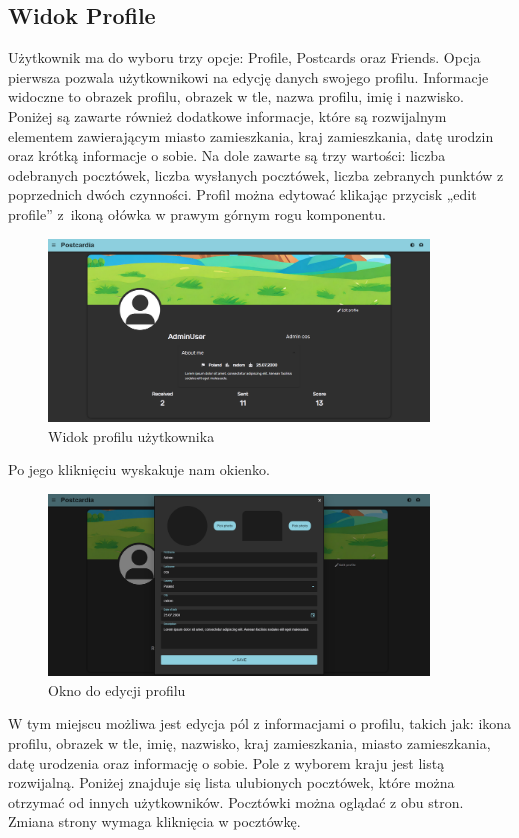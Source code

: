 \documentclass[a4paper,twoside,12pt]{book}
\begin{document}
\subsection{Widok Profile}
Użytkownik ma do wyboru trzy opcje: Profile, Postcards oraz Friends.
Opcja pierwsza pozwala użytkownikowi na edycję danych swojego profilu. Informacje widoczne to obrazek profilu, obrazek w tle, nazwa profilu, imię i nazwisko. Poniżej są zawarte również dodatkowe informacje, które są rozwijalnym elementem zawierającym miasto zamieszkania, kraj zamieszkania, datę urodzin oraz krótką informacje o sobie. Na dole zawarte są trzy wartości: liczba odebranych pocztówek, liczba wysłanych pocztówek, liczba zebranych punktów z poprzednich dwóch czynności. Profil można edytować klikając przycisk „edit profile” z~ikoną ołówka w prawym górnym rogu komponentu. 
\begin{figure}[H]
    \centering
    \includegraphics[width=0.9\textwidth]{webowka_ss/profile.png}
    \caption{Widok profilu użytkownika}
\end{figure}
Po jego kliknięciu wyskakuje nam okienko.
\begin{figure}[H]
    \centering
    \includegraphics[width=0.9\textwidth]{webowka_ss/edit_profile.png}
    \caption{Okno do edycji profilu}
\end{figure}
\newpage
W tym miejscu możliwa jest edycja pól z informacjami o profilu, takich jak: ikona profilu, obrazek w tle, imię, nazwisko, kraj zamieszkania, miasto zamieszkania, datę urodzenia oraz informację o sobie. Pole z wyborem kraju jest listą rozwijalną. Poniżej znajduje się lista ulubionych pocztówek, które można otrzymać od innych użytkowników. Pocztówki można oglądać z obu stron. Zmiana strony wymaga kliknięcia w pocztówkę.
\end{document}
